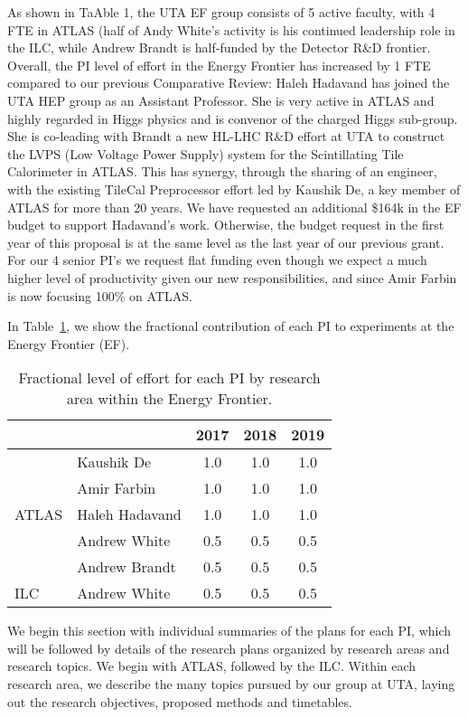 
As shown in TaAble 1, the UTA EF group consists of 5 active faculty, with 4 FTE in ATLAS (half of Andy White's activity is his continued leadership role in the ILC, while Andrew Brandt is half-funded by the Detector R&D frontier. Overall, the PI level of effort in the Energy Frontier has increased by 1 FTE compared to our previous Comparative Review: Haleh Hadavand has joined the UTA HEP group as an Assistant Professor. She is very active in ATLAS and highly regarded in Higgs physics and is convenor of the charged Higgs sub-group. She is co-leading with  Brandt a new HL-LHC R\&D effort at UTA to construct the LVPS (Low Voltage Power Supply) system for the Scintillating Tile Calorimeter in ATLAS. This has synergy, through the sharing of an engineer, with the existing TileCal Preprocessor effort led by Kaushik De, a key member of ATLAS for more than 20 years. We have requested an additional \$164k in the EF budget to support Hadavand's  work. Otherwise, the budget request in the first year of this proposal is at the  same level as the last year of our previous grant. For our 4 senior PI's we request flat funding even though we expect a much higher level of productivity given our new responsibilities, and since Amir Farbin is now focusing 100\% on ATLAS.   

In Table~\ref{table:ef-fractions}, we show the fractional contribution of each PI to experiments at the Energy Frontier (EF).

\begin{table}[htb]
\centering
\begin{tabular}{ l | l | c | c | c }
\hline \hline
\multicolumn{2}{c|}{} & 2017 & 2018 & 2019 \\ \hline
\multirow{5}{*}{ATLAS} & Kaushik De & 1.0 & 1.0 & 1.0 \\ \cline{2-5}
 & Amir Farbin & 1.0 & 1.0 &1.0 \\ \cline{2-5}
 & Haleh Hadavand & 1.0 & 1.0 & 1.0 \\ \cline{2-5}
 & Andrew White & 0.5 & 0.5 & 0.5 \\ \cline{2-5}
 & Andrew Brandt & 0.5 & 0.5 & 0.5 \\ \hline
ILC & Andrew White & 0.5 & 0.5 & 0.5 \\ \hline  \hline
\end{tabular}
\caption{Fractional level of effort for each PI by research area within the Energy Frontier.}
\label{table:ef-fractions}
\end{table}

We begin this section with individual summaries of the plans for each PI, which will be followed by details of the research plans organized by research areas and research topics. We begin with ATLAS, followed by the ILC. Within each research area, we describe the many topics pursued by our group at UTA, laying out the research objectives, proposed methods and timetables.

